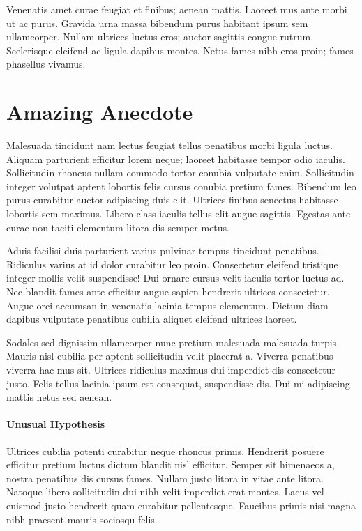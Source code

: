 \documentclass{article}
\begin{document}
Venenatis amet curae feugiat et finibus; aenean mattis. Laoreet mus ante morbi ut ac purus. Gravida urna massa bibendum purus habitant ipsum sem ullamcorper. Nullam ultrices luctus eros; auctor sagittis congue rutrum. Scelerisque eleifend ac ligula dapibus montes. Netus fames nibh eros proin; fames phasellus vivamus.

\section{Amazing Anecdote}
Malesuada tincidunt nam lectus feugiat tellus penatibus morbi ligula luctus. Aliquam parturient efficitur lorem neque; laoreet habitasse tempor odio iaculis. Sollicitudin rhoncus nullam commodo tortor conubia vulputate enim. Sollicitudin integer volutpat aptent lobortis felis cursus conubia pretium fames. Bibendum leo purus curabitur auctor adipiscing duis elit. Ultrices finibus senectus habitasse lobortis sem maximus. Libero class iaculis tellus elit augue sagittis. Egestas ante curae non taciti elementum litora dis semper metus.

Aduis facilisi duis parturient varius pulvinar tempus tincidunt penatibus. Ridiculus varius at id dolor curabitur leo proin. Consectetur eleifend tristique integer mollis velit suspendisse! Dui ornare cursus velit iaculis tortor luctus ad. Nec blandit fames ante efficitur augue sapien hendrerit ultrices consectetur. Augue orci accumsan in venenatis lacinia tempus elementum. Dictum diam dapibus vulputate penatibus cubilia aliquet eleifend ultrices laoreet.

Sodales sed dignissim ullamcorper nunc pretium malesuada malesuada turpis. Mauris nisl cubilia per aptent sollicitudin velit placerat a. Viverra penatibus viverra hac mus sit. Ultrices ridiculus maximus dui imperdiet dis consectetur justo. Felis tellus lacinia ipsum est consequat, suspendisse dis. Dui mi adipiscing mattis netus sed aenean.

\paragraph{Unusual Hypothesis}
Ultrices cubilia potenti curabitur neque rhoncus primis. Hendrerit posuere efficitur pretium luctus dictum blandit nisl efficitur. Semper sit himenaeos a, nostra penatibus dis cursus fames. Nullam justo litora in vitae ante litora. Natoque libero sollicitudin dui nibh velit imperdiet erat montes. Lacus vel euismod justo hendrerit quam curabitur pellentesque. Faucibus primis nisi magna nibh praesent mauris sociosqu felis.
\end{document}
